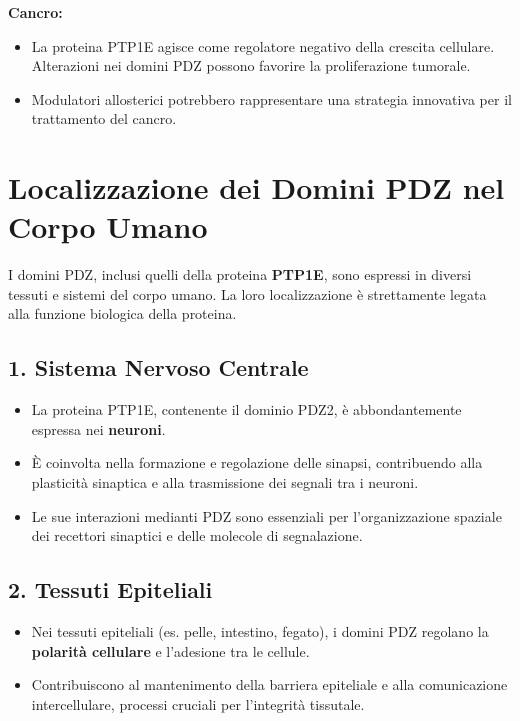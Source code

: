 \documentclass[Lau,binding=0.6cm,oneside,noexaminfo]{sapthesis}
\begin{document}
\textbf{Cancro:}
\begin{itemize}
    \item La proteina PTP1E agisce come regolatore negativo della crescita cellulare. Alterazioni nei domini PDZ possono favorire la proliferazione tumorale.
    \item Modulatori allosterici potrebbero rappresentare una strategia innovativa per il trattamento del cancro.
\end{itemize}

\section{Localizzazione dei Domini PDZ nel Corpo Umano}

I domini PDZ, inclusi quelli della proteina \textbf{PTP1E}, sono espressi in diversi tessuti e sistemi del corpo umano. La loro localizzazione è strettamente legata alla funzione biologica della proteina.

\subsection{1. Sistema Nervoso Centrale}
\begin{itemize}
    \item La proteina PTP1E, contenente il dominio PDZ2, è abbondantemente espressa nei \textbf{neuroni}.
    \item È coinvolta nella formazione e regolazione delle sinapsi, contribuendo alla plasticità sinaptica e alla trasmissione dei segnali tra i neuroni.
    \item Le sue interazioni medianti PDZ sono essenziali per l'organizzazione spaziale dei recettori sinaptici e delle molecole di segnalazione.
\end{itemize}

\subsection{2. Tessuti Epiteliali}
\begin{itemize}
    \item Nei tessuti epiteliali (es. pelle, intestino, fegato), i domini PDZ regolano la \textbf{polarità cellulare} e l'adesione tra le cellule.
    \item Contribuiscono al mantenimento della barriera epiteliale e alla comunicazione intercellulare, processi cruciali per l'integrità tissutale.
\end{itemize}
\end{document}
